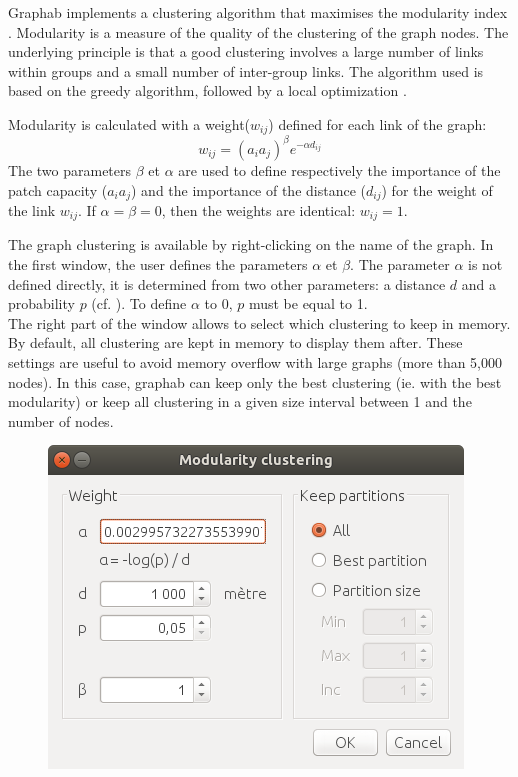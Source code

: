 \documentclass{article}
\begin{document}
Graphab implements a clustering algorithm that maximises the modularity index \cite{Newman2006}. Modularity is a measure of the quality of the clustering of the graph nodes. The underlying principle is that a good clustering involves a large number of links within groups and a small number of inter-group links. The algorithm used is based on the greedy algorithm, followed by a local optimization \cite{Brandes2008}.

Modularity is calculated with a weight($w_{ij}$) defined for each link of the graph:
$$w_{ij} = (a_i a_j)^\beta e^{-\alpha d_{ij}}$$
The two parameters $\beta$ et $\alpha$ are used to define respectively the importance of the patch capacity ($a_i a_j$) and the importance of the distance ($d_{ij}$) for the weight of the link $w_{ij}$. If $\alpha = \beta = 0$, then the weights are identical: $w_{ij} = 1$.  

The graph clustering is available by right-clicking on the name of the graph. In the first window, the user defines the parameters $\alpha$ et $\beta$. The parameter $\alpha$ is not defined directly, it is determined from two other parameters: a distance $d$ and a probability $p$ (cf. ). To define $\alpha$ to 0, $p$ must be equal to 1.\\
The right part of the window allows to select which clustering to keep in memory. By default, all clustering are kept in memory to display them after. These settings are useful to avoid memory overflow with large graphs (more than 5,000 nodes). In this case, graphab can keep only the best clustering (ie. with the best modularity) or keep all clustering in a given size interval between 1 and the number of nodes.

\begin{figure}[H]
	\includegraphics[scale=0.36]{img/manual-en_clustering.png} 
\end{figure}
\end{document}
